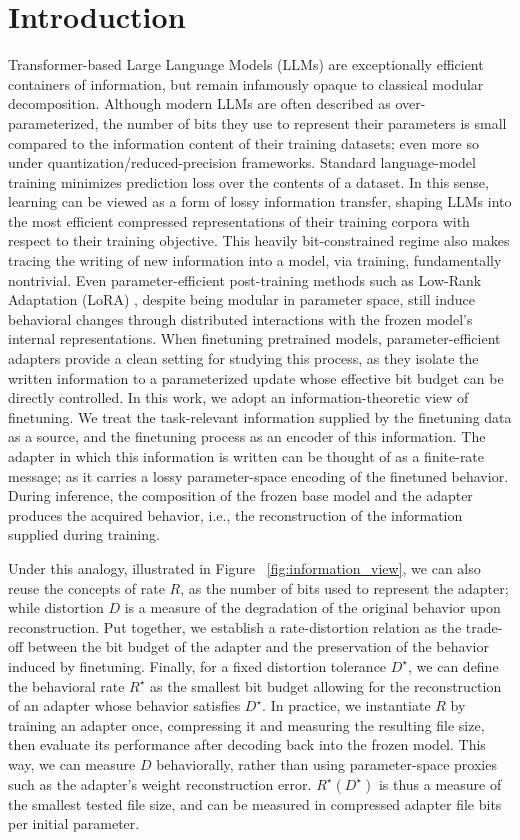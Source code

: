 \section{Introduction}

Transformer-based Large Language Models (LLMs) are exceptionally efficient containers of information, but remain infamously opaque to classical modular decomposition. Although modern LLMs are often described as over-parameterized, the number of bits they use to represent their parameters is small compared to the information content of their training datasets; even more so under quantization/reduced-precision frameworks. Standard language-model training minimizes prediction loss over the contents of a dataset. In this sense, learning can be viewed as a form of lossy information transfer, shaping LLMs into the most efficient compressed representations of their training corpora with respect to their training objective.
\newline
This heavily bit-constrained regime also makes tracing the writing of new information into a model, via training, fundamentally nontrivial. Even parameter-efficient post-training methods such as Low-Rank Adaptation (LoRA) \citep{hu2022lora}, despite being modular in parameter space, still induce behavioral changes through distributed interactions with the frozen model’s internal representations. When finetuning pretrained models, parameter-efficient adapters provide a clean setting for studying this process, as they isolate the written information to a parameterized update whose effective bit budget can be directly controlled.
\newline
In this work, we adopt an information-theoretic view of finetuning. We treat the task-relevant information supplied by the finetuning data as a source, and the finetuning process as an encoder of this information. The adapter in which this information is written can be thought of as a finite-rate message; as it carries a lossy parameter-space encoding of the finetuned behavior. During inference, the composition of the frozen base model and the adapter produces the acquired behavior, i.e., the reconstruction of the information supplied during training.

Under this analogy, illustrated in Figure \ \ref{fig:information_view}, we can also reuse the concepts of rate $R$, as the number of bits used to represent the adapter; while distortion $D$ is a measure of the degradation of the original behavior upon reconstruction. Put together, we establish a rate-distortion relation as the trade-off between the bit budget of the adapter and the preservation of the behavior induced by finetuning. Finally, for a fixed distortion tolerance $D^\star$, we can define the behavioral rate $R^\star$ as the smallest bit budget allowing for the reconstruction of an adapter whose behavior satisfies $D^\star$. In practice, we instantiate $R$ by training an adapter once, compressing it and measuring the resulting file size, then evaluate its performance after decoding back into the frozen model. This way, we can measure $D$ behaviorally, rather than using parameter-space proxies such as the adapter's weight reconstruction error. $R^\star(D^\star)$ is thus a measure of the smallest tested file size, and can be measured in compressed adapter file bits per initial parameter.
